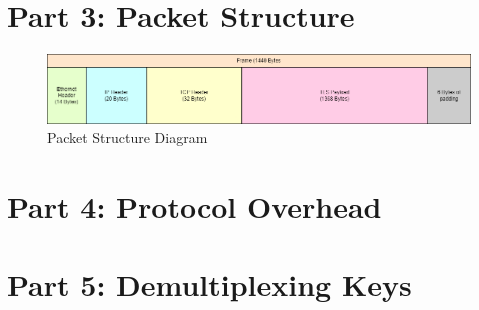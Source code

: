 \documentclass{report}
\begin{document}
    \chapter*{Part 3: Packet Structure}
    \begin{figure}[h]
        \includegraphics[width=\textwidth]{images/packet_structure.drawio.png}
        \caption{Packet Structure Diagram}
    \end{figure}
    \chapter*{Part 4: Protocol Overhead}

    \chapter*{Part 5: Demultiplexing Keys}
\end{document}
